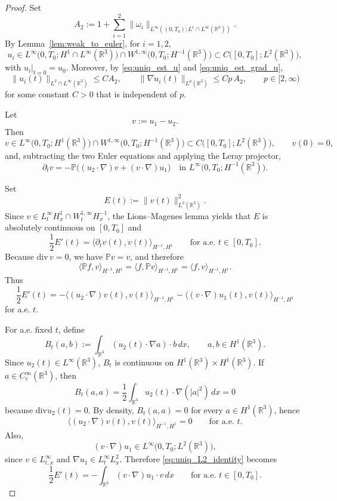 \documentclass[reqno,11pt]{amsart}
\renewcommand{\div}{\mathrm{div}}
\begin{document}
\begin{proof}
Set
\[
A_2:=1+\sum_{i=1}^2
\|\omega_i\|_{L^\infty((0,T_0);L^1\cap L^\infty(\mathbb R^3))}.
\]
By Lemma~\ref{lem:weak_to_euler}, for $i=1,2$,
\[
u_i\in L^\infty\!\bigl(0,T_0;H^1\cap L^\infty(\mathbb R^3)\bigr)
\cap W^{1,\infty}\!\bigl(0,T_0;H^{-1}(\mathbb R^3)\bigr)
\subset C\bigl([0,T_0];L^2(\mathbb R^3)\bigr),
\]
with $u_i|_{t=0}=u_0$. Moreover, by \eqref{eq:uniq_est_u} and
\eqref{eq:uniq_est_grad_u},
\[
\|u_i(t)\|_{L^2\cap L^\infty(\mathbb R^3)}\le C A_2,
\qquad
\|\nabla u_i(t)\|_{L^p(\mathbb R^3)}\le C p\,A_2,
\qquad p\in[2,\infty)
\]
for some constant $C>0$ that is independent of $p$.

Let
\[
v:=u_1-u_2.
\]
Then
\[
v\in L^\infty\!\bigl(0,T_0;H^1(\mathbb R^3)\bigr)
\cap W^{1,\infty}\!\bigl(0,T_0;H^{-1}(\mathbb R^3)\bigr)
\subset C\bigl([0,T_0];L^2(\mathbb R^3)\bigr),
\qquad
v(0)=0,
\]
and, subtracting the two Euler equations and applying the Leray projector,
\[
\partial_t v
=
-\mathbb P\bigl((u_2\cdot\nabla)v+(v\cdot\nabla)u_1\bigr)
\quad\text{in }L^\infty\!\bigl(0,T_0;H^{-1}(\mathbb R^3)\bigr).
\]

Set
\[
E(t):=\|v(t)\|_{L^2(\mathbb R^3)}^2.
\]
Since $v\in L^\infty_tH^1_x\cap W^{1,\infty}_tH^{-1}_x$, the Lions--Magenes lemma yields
that $E$ is absolutely continuous on $[0,T_0]$ and
\[
\frac12 E'(t)=\langle \partial_t v(t),v(t)\rangle_{H^{-1},H^1}
\qquad\text{for a.e. }t\in[0,T_0].
\]
Because $\div\, v=0$, we have $\mathbb P v=v$, and therefore
\[
\langle \mathbb P f,v\rangle_{H^{-1},H^1}
=
\langle f,\mathbb P v\rangle_{H^{-1},H^1}
=
\langle f,v\rangle_{H^{-1},H^1}.
\]
Thus
\begin{equation}
\label{eq:uniq_L2_identity}
\frac12 E'(t)
=
-\big\langle (u_2\cdot\nabla)v(t),v(t)\big\rangle_{H^{-1},H^1}
-\big\langle (v\cdot\nabla)u_1(t),v(t)\big\rangle_{H^{-1},H^1}
\end{equation}
for a.e. $t$.

For a.e. fixed $t$, define
\[
B_t(a,b):=\int_{\mathbb R^3}(u_2(t)\cdot\nabla a)\cdot b\,dx,
\qquad a,b\in H^1(\mathbb R^3).
\]
Since $u_2(t)\in L^\infty(\mathbb R^3)$, $B_t$ is continuous on
$H^1(\mathbb R^3)\times H^1(\mathbb R^3)$. If
$a\in C_c^\infty(\mathbb R^3)$, then
\[
B_t(a,a)
=
\frac12\int_{\mathbb R^3}u_2(t)\cdot\nabla \left( |a|^2 \right)\,dx
=0
\]
because $\div u_2(t)=0$. By density, $B_t(a,a)=0$ for every
$a\in H^1(\mathbb R^3)$, hence
\[
\big\langle (u_2\cdot\nabla)v(t),v(t)\big\rangle_{H^{-1},H^1}=0
\qquad\text{for a.e. }t.
\]
Also,
\[
(v\cdot\nabla)u_1\in L^\infty\!\bigl(0,T_0;L^2(\mathbb R^3)\bigr),
\]
since $v\in L^\infty_{t,x}$ and $\nabla u_1\in L^\infty_tL^2_x$.
Therefore \eqref{eq:uniq_L2_identity} becomes
\[
\frac12 E'(t)
=
-\int_{\mathbb R^3}(v\cdot\nabla)u_1\cdot v\,dx
\qquad\text{for a.e. }t\in[0,T_0].
\]


\end{proof}
\end{document}
